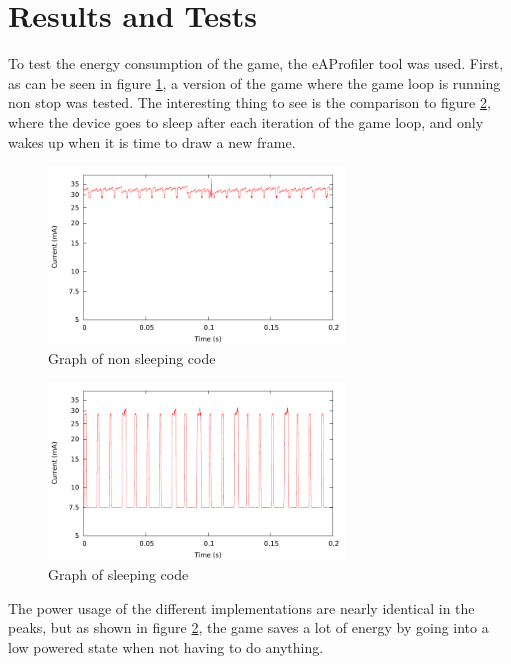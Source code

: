 \section{Results and Tests}
To test the energy consumption of the game, the eAProfiler tool was used. First,
as can be seen in figure \ref{fig:nosleep}, a version of the game where the game loop
is running non stop was tested. The interesting thing to see is the comparison
to figure \ref{fig:sleep}, where the device goes to sleep after each iteration
of the game loop, and only wakes up when it is time to draw a new frame.

\begin{figure}[H]
\centering
\includegraphics[width=0.7\textwidth]{figures/nosleep.pdf}
\caption{Graph of non sleeping code}
\label{fig:nosleep}
\end{figure}

\begin{figure}[H]
\centering
\includegraphics[width=0.7\textwidth]{figures/sleep.pdf}
\caption{Graph of sleeping code}
\label{fig:sleep}
\end{figure}

The power usage of the different implementations are nearly identical in the
peaks, but as shown in figure \ref{fig:sleep}, the game saves a lot of energy by
going into a low powered state when not having to do anything.

